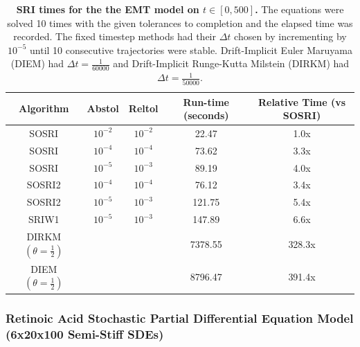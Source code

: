 \documentclass{article}
\begin{document}
\begin{center}
	\begin{table}
		\begin{centering}
			{\footnotesize
			\begin{tabular}{|c|c|c|c|c|}
				\hline
				Algorithm & Abstol & Reltol & Run-time (seconds) & Relative Time (vs SOSRI)\tabularnewline
				\hline
				\hline
				SOSRI & $10^{-2}$ & $10^{-2}$ & 22.47 & 1.0x\tabularnewline
				\hline
				SOSRI & $10^{-4}$ & $10^{-4}$ & 73.62 & 3.3x\tabularnewline
				\hline
				SOSRI & $10^{-5}$ & $10^{-3}$ & 89.19 & 4.0x\tabularnewline
				\hline
				SOSRI2 & $10^{-4}$ & $10^{-4}$ & 76.12 & 3.4x\tabularnewline
				\hline
				SOSRI2 & $10^{-5}$ & $10^{-3}$ & 121.75 & 5.4x\tabularnewline
				\hline
				SRIW1 & $10^{-5}$ & $10^{-3}$ & 147.89 & 6.6x\tabularnewline
				\hline
				DIRKM $\left(\theta=\frac{1}{2}\right)$  &  &  & 7378.55 & 328.3x\tabularnewline
				\hline
				DIEM $\left(\theta=\frac{1}{2}\right)$ &  &  & 8796.47 & 391.4x\tabularnewline
				\hline
			\end{tabular}
			}%
			\par\end{centering}
		\caption{\textbf{SRI times for the the EMT model on $t\in\left[0,500\right]$.}
			The equations were solved 10 times with the given tolerances to completion
			and the elapsed time was recorded. The fixed timestep methods had
			their $\Delta t$ chosen by incrementing by $10^{-5}$ until 10 consecutive
			trajectories were stable. Drift-Implicit Euler Maruyama (DIEM) had
			$\Delta t=\frac{1}{60000}$ and Drift-Implicit Runge-Kutta Milstein (DIRKM)
			had $\Delta t=\frac{1}{50000}$.
			\label{tab:SRI-times-for-Oval2-long}}
	\end{table}
	\par\end{center}

\subsubsection{Retinoic Acid Stochastic Partial Differential Equation Model (6x20x100
	Semi-Stiff SDEs)}
\end{document}
